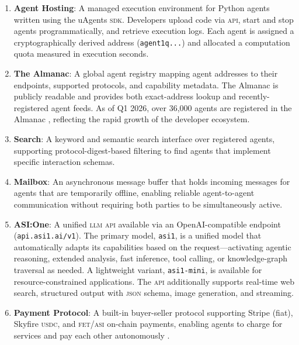 \documentclass[twoside,11pt]{article}
\begin{document}
\begin{enumerate}[leftmargin=*]

\item \textbf{Agent Hosting}: A managed execution environment for Python agents
written using the uAgents \textsc{sdk}.  Developers upload code via
\textsc{api}, start and stop agents programmatically, and retrieve execution
logs.  Each agent is assigned a cryptographically derived address
(\texttt{agent1q...}) and allocated a computation quota measured in execution
seconds.

\item \textbf{The Almanac}: A global agent registry mapping agent addresses to
their endpoints, supported protocols, and capability metadata.  The Almanac is
publicly readable and provides both exact-address lookup and recently-registered
agent feeds.  As of Q1 2026, over 36,000 agents are registered in the Almanac
\citep{kantor2026stateofagents}, reflecting the rapid growth of the developer
ecosystem.

\item \textbf{Search}: A keyword and semantic search interface over registered
agents, supporting protocol-digest-based filtering to find agents that implement
specific interaction schemas.

\item \textbf{Mailbox}: An asynchronous message buffer that holds incoming
messages for agents that are temporarily offline, enabling reliable
agent-to-agent communication without requiring both parties to be simultaneously
active.

\item \textbf{ASI:One}: A unified \textsc{llm} \textsc{api} available via an
OpenAI-compatible endpoint (\texttt{api.asi1.ai/v1}).  The primary model,
\texttt{asi1}, is a unified model that automatically adapts its capabilities
based on the request---activating agentic reasoning, extended analysis, fast
inference, tool calling, or knowledge-graph traversal as needed.  A
lightweight variant, \texttt{asi1-mini}, is available for resource-constrained
applications.  The \textsc{api} additionally supports real-time web search,
structured output with \textsc{json} schema, image generation, and streaming.

\item \textbf{Payment Protocol}: A built-in buyer-seller protocol supporting
Stripe (fiat), Skyfire \textsc{usdc}, and \textsc{fet}/\textsc{asi} on-chain
payments, enabling agents to charge for services and pay each other
autonomously \citep{fetchai2026payments}.

\end{enumerate}
\end{document}
